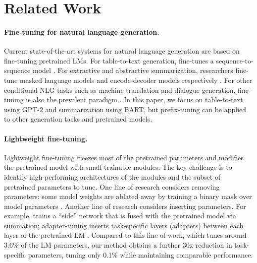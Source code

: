 \section{Related Work}

\label{sec:related_work}
\paragraph{Fine-tuning for natural language generation.} Current state-of-the-art systems for natural language generation are based on fine-tuning pretrained LMs. For table-to-text generation, \citet{kale2020texttotext} fine-tunes a sequence-to-sequence model \citep[T5;][]{T5}. 
For extractive and abstractive summarization, researchers fine-tune masked language models \citep[e.g., BERT;][]{devlin-etal-2019-bert} and encode-decoder models \citep[e.g., BART;][]{lewis-etal-2020-bart}  respectively \cite{zhong-etal-2020-extractive, liu-lapata-2019-text,T5}. For other conditional NLG tasks such as machine translation and dialogue generation, fine-tuning is also the prevalent paradigm \cite{zhang-etal-2020-dialogpt, stickland2020recipes, Zhu2020Incorporating, liu2020multilingual}. In this paper, we focus on table-to-text using GPT-2 and summarization using BART, but prefix-tuning can be applied to other generation tasks and pretrained models.

\paragraph{Lightweight fine-tuning.} Lightweight fine-tuning freezes most of the pretrained parameters and modifies the pretrained model with small trainable modules. The key challenge is to identify high-performing architectures of the modules and the subset of pretrained parameters to tune. One line of research considers removing parameters: some model weights are ablated away by training a binary mask over model parameters \cite{zhao2020masking,dixit2020How}. Another line of research considers inserting parameters. For example, \citet{zhang2020sidetuning} trains a ``side'' network that is fused with the pretrained model via summation; adapter-tuning inserts task-specific layers (adapters) between each layer of the pretrained LM \cite{pmlr-v97-houlsby19a,lin-etal-2020-exploring,Rebuffi2017Adapter,pfeiffer2020adapterfusion}. Compared to this line of work, which tunes around $3.6\%$ of the LM parameters, our method obtains a further 30x reduction in task-specific parameters, tuning only 0.1\% while maintaining comparable performance. 

